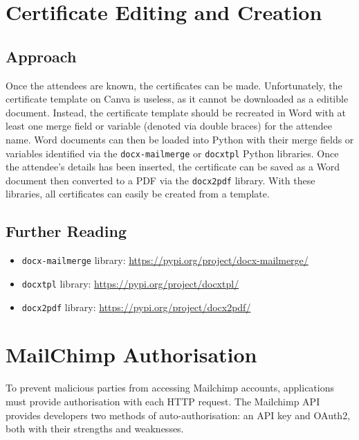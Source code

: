 \documentclass[11pt]{article}
\begin{document}
\newpage

\section{Certificate Editing and Creation}

\subsection{Approach}

Once the attendees are known, the certificates can be made. Unfortunately, the certificate template on Canva is useless, as it cannot be downloaded as a editible document. Instead, the certificate template should be recreated in Word with at least one merge field or variable (denoted via double braces) for the attendee name. Word documents can then be loaded into Python with their merge fields or variables identified via the \texttt{docx-mailmerge} or \texttt{docxtpl} Python libraries. Once the attendee's details has been inserted, the certificate can be saved as a Word document then converted to a PDF via the \texttt{docx2pdf} library. With these libraries, all certificates can easily be created from a template.

\subsection{Further Reading}

\begin{itemize}
    \item \texttt{docx-mailmerge} library: \url{https://pypi.org/project/docx-mailmerge/}
    \item \texttt{docxtpl} library: \url{https://pypi.org/project/docxtpl/}
    \item \texttt{docx2pdf} library: \url{https://pypi.org/project/docx2pdf/}
\end{itemize}

\newpage

\section{MailChimp Authorisation}

To prevent malicious parties from accessing Mailchimp accounts, applications must provide authorisation with each HTTP request. The Mailchimp API provides developers two methods of auto-authorisation: an API key and OAuth2, both with their strengths and weaknesses.
\end{document}
